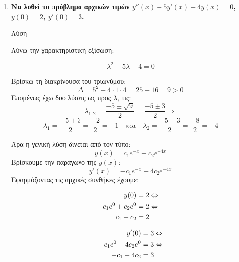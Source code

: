 \begin{enumerate}
  \item {\bfseries Να λυθεί το πρόβλημα αρχικών τιμών \boldmath $  y''(x) + 5y'(x) +4y(x)=0
    $, \boldmath $ y(0)=2 $, \boldmath $ y'(0)=3 $.}

    \begin{description}
      \item[Λύση] 
    \end{description}

    Λύνω την χαρακτηριστική εξίσωση:

    \[
      \lambda ^{2} +5 \lambda + 4 = 0 
    \] 

    Βρίσκω τη διακρίνουσα του τριωνύμου:
    \[
      \Delta = 5^{2}-4 \cdot 1 \cdot 4 = 25 - 16 = 9 > 0
    \] 
    Επομένως έχω δυο λύσεις ως προς $\lambda$, τις: 
    \[
      \lambda _{1,2} = \frac{-5 \pm \sqrt{9}}{2} = \frac{-5 \pm 3}{2} \Rightarrow  
    \]
    \[
      \lambda _{1} = \frac{-5+3}{2} = \frac{-2}{2} = -1 \quad \text{και} \quad
      \lambda _{2} = \frac{-5-3}{2} = \frac{-8}{2} = -4   
    \] 

    Άρα η γενική λύση δίνεται από τον τύπο:
    \[
      y(x)= c_{1}e^{-x}+ c_{2}e^{-4x} 
    \] 
    Βρίσκουμε την παράγωγο της $ y(x) $:
    \[
      y'(x) = -c_{1}e^{-x}-4 c_{2}e^{-4x} 
    \]
    Εφαρμόζοντας τις αρχικές συνθήκες έχουμε:

    \begin{minipage}{0.4\textwidth}
      \begin{align}
        y(0)&=2 \notag \Leftrightarrow  \\ 
        c_{1}e^{0}+ c_{2}e^{0} &= 2 \notag \Leftrightarrow \\ 
        c_{1} + c_{2} &= 2 \label{eq:1} 
      \end{align} 
    \end{minipage} 
    \hspace{\baselineskip} 
    \begin{minipage}{0.4\textwidth}
      \begin{align}
        y'(0)&=3 \notag \Leftrightarrow \\
        -c_{1}e^{0}-4 c_{2}e^{0} &= 3 \notag \Leftrightarrow \\
        -c_{1} - 4 c_{2} &= 3 \label{eq:2}
      \end{align}
    \end{minipage}


\end{enumerate}
